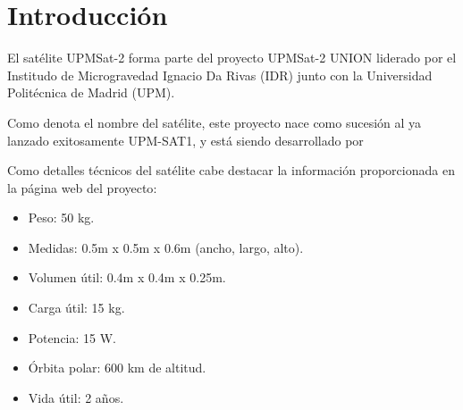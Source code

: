 
\chapter{Introducción}
\label{chap:introduccion}

El satélite UPMSat-2 forma parte del proyecto UPMSat-2 UNION liderado por el
Institudo de Microgravedad Ignacio Da Rivas (IDR) junto con la Universidad
Politécnica de Madrid (UPM).

Como denota el nombre del satélite, este proyecto nace como sucesión al
ya lanzado exitosamente UPM-SAT1, y está siendo desarrollado por 

Como detalles técnicos del satélite cabe destacar la información proporcionada
en la página web del proyecto\cite{web-upmsat2}:
\begin{itemize}
\item Peso: 50 kg.
\item Medidas: 0.5m x 0.5m x 0.6m (ancho, largo, alto).
\item Volumen útil: 0.4m x 0.4m x 0.25m.
\item Carga útil: 15 kg.
\item Potencia: 15 W.
\item Órbita polar: 600 km de altitud.
\item Vida útil: 2 años.
\end{itemize}

